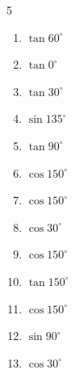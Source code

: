\begin{multicols}{5}
\begin{enumerate}
  \item $\displaystyle \tan{60^\circ}$


  \item $\displaystyle \tan{0^\circ}$

        \phantom{$\displaystyle =0$}

  \item $\displaystyle \tan{30^\circ}$


  \item $\displaystyle \sin{135^\circ}$


  \item $\displaystyle \tan{90^\circ}$

        \phantom{$\displaystyle なし$}

\columnbreak %

  \item $\displaystyle \cos{150^\circ}$


  \item $\displaystyle \cos{150^\circ}$


  \item $\displaystyle \cos{30^\circ}$


  \item $\displaystyle \cos{150^\circ}$


  \item $\displaystyle \tan{150^\circ}$


  \item $\displaystyle \cos{150^\circ}$


  \item $\displaystyle \sin{90^\circ}$

        \phantom{$\displaystyle =1$}

  \item $\displaystyle \cos{30^\circ}$


\end{enumerate}
\end{multicols}
